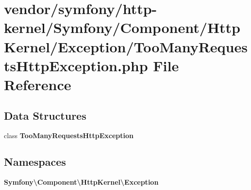 \section{vendor/symfony/http-\/kernel/\+Symfony/\+Component/\+Http\+Kernel/\+Exception/\+Too\+Many\+Requests\+Http\+Exception.php File Reference}
\label{_too_many_requests_http_exception_8php}
\subsection*{Data Structures}
\begin{DoxyCompactItemize}
\item 
class {\bf Too\+Many\+Requests\+Http\+Exception}
\end{DoxyCompactItemize}
\subsection*{Namespaces}
\begin{DoxyCompactItemize}
\item 
 {\bf Symfony\textbackslash{}\+Component\textbackslash{}\+Http\+Kernel\textbackslash{}\+Exception}
\end{DoxyCompactItemize}
